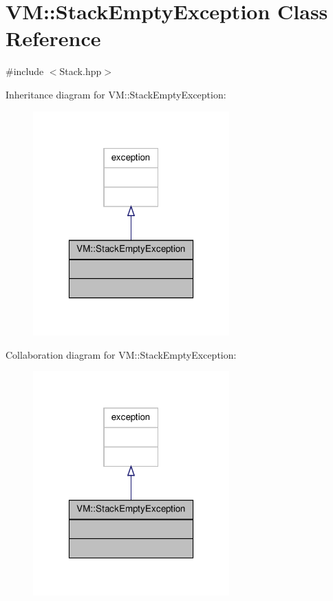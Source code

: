 \hypertarget{class_v_m_1_1_stack_empty_exception}{\section{V\-M\-:\-:Stack\-Empty\-Exception Class Reference}
\label{class_v_m_1_1_stack_empty_exception}
}


{\ttfamily \#include $<$Stack.\-hpp$>$}



Inheritance diagram for V\-M\-:\-:Stack\-Empty\-Exception\-:
\nopagebreak
\begin{figure}[H]
\begin{center}
\leavevmode
\includegraphics[width=214pt]{class_v_m_1_1_stack_empty_exception__inherit__graph}
\end{center}
\end{figure}


Collaboration diagram for V\-M\-:\-:Stack\-Empty\-Exception\-:
\nopagebreak
\begin{figure}[H]
\begin{center}
\leavevmode
\includegraphics[width=214pt]{class_v_m_1_1_stack_empty_exception__coll__graph}
\end{center}
\end{figure}


